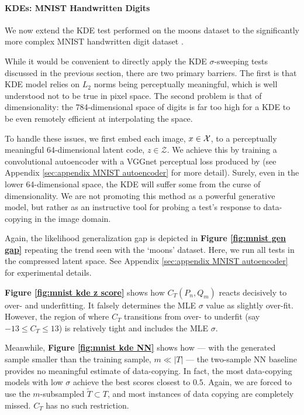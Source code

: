 \paragraph{KDEs: MNIST Handwritten Digits}
\label{sec:MNIST KDE}
We now extend the KDE test performed on the moons dataset to the significantly more complex MNIST handwritten digit dataset \citep{lecun}. 

While it would be convenient to directly apply the KDE $\sigma$-sweeping tests discussed in the previous section, there are two primary barriers. The first is that KDE model relies on $L_2$ norms being perceptually meaningful, which is well understood not to be true in pixel space. The second problem is that of dimensionality: the 784-dimensional space of digits is far too high for a KDE to be even remotely efficient at interpolating the space. 

To handle these issues, we first embed each image, $x \in \mathcal{X}$, to a perceptually meaningful 64-dimensional latent code, $z \in \mathcal{Z}$. We achieve this by training a convolutional autoencoder with a VGGnet perceptual loss produced by \cite{zhang} (see Appendix \ref{sec:appendix MNIST autoencoder} for more detail). Surely, even in the lower 64-dimensional space, the KDE will suffer some from the curse of dimensionality. We are not promoting this method as a powerful generative model, but rather as an instructive tool for probing a test's response to data-copying in the image domain. 

Again, the likelihood generalization gap is depicted in \textbf{Figure \ref{fig:mnist gen gap}} repeating the trend seen with the `moons' dataset. 
Here, we run all tests in the compressed latent space. See Appendix \ref{sec:appendix MNIST autoencoder} for experimental details. 

\textbf{Figure \ref{fig:mnist kde z score}} shows how $C_T(P_n, Q_m)$ reacts decisively to over- and underfitting. It falsely determines the MLE $\sigma$ value as slightly over-fit. However, the region of where $C_T$ transitions from over- to underfit (say $-13 \leq C_T \leq 13$) is relatively tight and includes the MLE $\sigma$.

Meanwhile, \textbf{Figure \ref{fig:mnist kde NN}} shows how --- with the generated sample smaller than the training sample, $m \ll |T|$ --- the two-sample NN baseline provides no meaningful estimate of data-copying. In fact, the most data-copying models with low $\sigma$ achieve the best scores closest to $0.5$. Again, we are forced to use the $m$-subsampled $\widetilde{T} \subset T$, and most instances of data copying are completely missed. $C_T$ has no such restriction.

